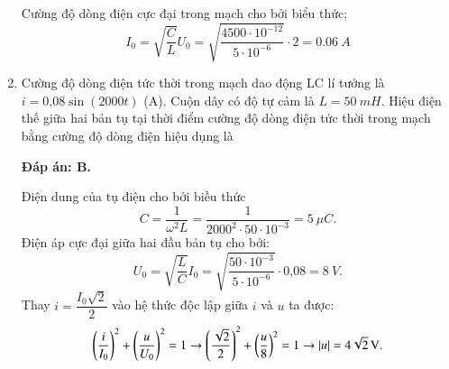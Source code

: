 \begin{enumerate}[label=\bfseries Câu \arabic*:]
{		Cường độ dòng điện cực đại trong mạch cho bởi biểu thức;
		$$
		I_{0}=\sqrt{\dfrac{C}{L}} U_{0}=\sqrt{\dfrac{4500\cdot10^{-12}}{5\cdot10^{-6}}} \cdot 2=\SI{0,06}{A}
		$$
		
	}
	
	\item {} 
	
	{Cường độ dòng điện tức thời trong mạch dao động LC lí tưởng là $i = \text{0,08} \sin \left( 2000t \right)$ (A). Cuộn dây có độ tự cảm là $L = \SI{50}{mH}$. Hiệu điện thế giữa hai bản tụ tại thời điểm cường độ dòng điện tức thời trong mạch bằng cường độ dòng điện hiệu dụng là
	}
	
	\hideall
	{		\textbf{Đáp án: B.}
		
		Điện dung của tụ điện cho bởi biều thức
		$$
		C=\dfrac{1}{\omega^{2} L}=\dfrac{1}{2000^{2} \cdot 50\cdot10^{-3}}= \SI{5}{\mu C}.
		$$
		Điện áp cực đại giữa hai đầu bản tụ cho bởi:
		$$
		U_{0}=\sqrt{\dfrac{L}{C}} I_{0}=\sqrt{\dfrac{50\cdot10^{-3}}{5\cdot10^{-6}}} \cdot \text{0,08}= \SI{8}{V}.
		$$
		Thay $i=\dfrac{I_{0} \sqrt{2}}{2}$ vào hệ thức độc lập giữa $i$ và $u$ ta được:
		$$
		\left(\dfrac{i}{I_{0}}\right)^{2}+\left(\dfrac{u}{U_{0}}\right)^{2}=1 \rightarrow\left(\dfrac{\sqrt{2}}{2}\right)^{2}+\left(\dfrac{u}{8}\right)^{2}=1 \rightarrow|u|= \xsi{4\sqrt{2}}{V}.
		$$
		
	}
	
\end{enumerate}

